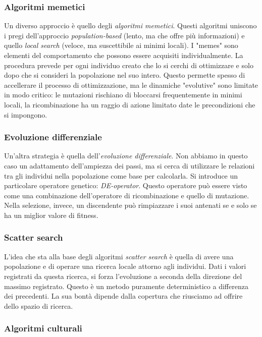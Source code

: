 \documentclass[10pt,a4paper]{article}
\begin{document}
\subsubsection{Algoritmi memetici}

Un diverso approccio è quello degli \emph{algoritmi memetici}. Questi algoritmi uniscono i pregi dell'approccio \emph{population-based} (lento, ma che offre più informazioni) e quello \emph{local search} (veloce, ma suscettibile ai minimi locali). I "memes" sono elementi del comportamento che possono essere acquisiti individualmente. La procedura prevede per ogni individuo creato che lo si cerchi di ottimizzare e solo dopo che si consideri la popolazione nel suo intero. Questo permette spesso di accellerare il processo di ottimizzazione, ma le dinamiche "evolutive" sono limitate in modo critico: le mutazioni rischiano di bloccarsi frequentemente in minimi locali, la ricombinazione ha un raggio di azione limitato date le precondizioni che si impongono. 

\subsubsection{Evoluzione differenziale}

Un'altra strategia è quella dell'\emph{evoluzione differenziale}. Non abbiamo in questo caso un adattamento dell'ampiezza dei passi, ma si cerca di utilizzare le relazioni tra gli individui nella popolazione come base per calcolarla. Si introduce un particolare operatore genetico: \emph{DE-operator}. Questo operatore può essere visto come una combinazione dell'operatore di ricombinazione e quello di mutazione. Nella selezione, invece, un discendente può rimpiazzare i suoi antenati se e solo se ha un miglior valore di fitness. 

\subsubsection{Scatter search}

L'idea che sta alla base degli algoritmi \emph{scatter search} è quella di avere una popolazione e di operare una ricerca locale attorno agli individui. Dati i valori registrati da questa ricerca, si forza l'evoluzione a seconda della direzione del massimo registrato. Questo è un metodo puramente deterministico a differenza dei precedenti. La sua bontà dipende dalla copertura che riusciamo ad offrire dello spazio di ricerca. 

\subsubsection{Algoritmi culturali}
\end{document}
